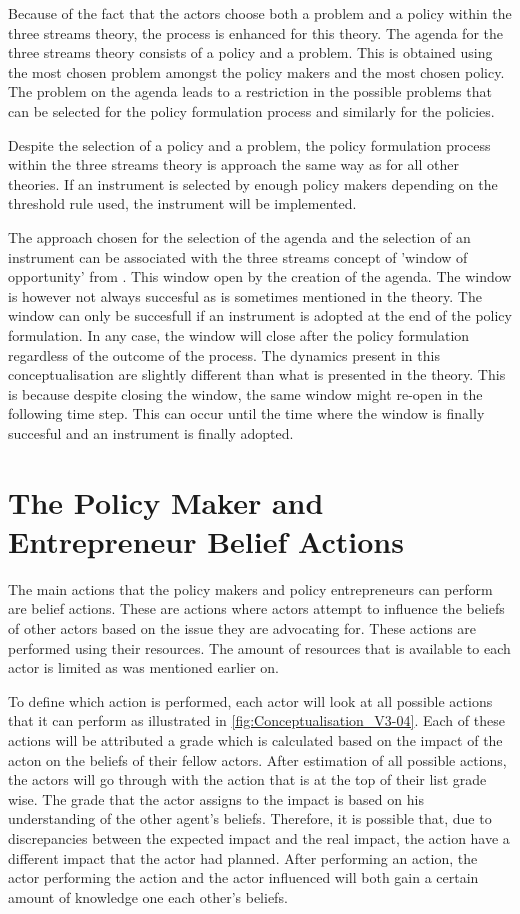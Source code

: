 Because of the fact that the actors choose both a problem and a policy within the three streams theory, the process is enhanced for this theory. The agenda for the three streams theory consists of a policy and a problem. This is obtained using the most chosen problem amongst the policy makers and the most chosen policy. The problem on the agenda leads to a restriction in the possible problems that can be selected for the policy formulation process and similarly for the policies.

Despite the selection of a policy and a problem, the policy formulation process within the three streams theory is approach the same way as for all other theories. If an instrument is selected by enough policy makers depending on the threshold rule used, the instrument will be implemented.

The approach chosen for the selection of the agenda and the selection of an instrument can be associated with the three streams concept of 'window of opportunity' from \cite{kingdon2003agendas}.  This window open by the creation of the agenda. The window is however not always succesful as is sometimes mentioned in the theory. The window can only be succesfull if an instrument is adopted at the end of the policy formulation. In any case, the window will close after the policy formulation regardless of the outcome of the process. The dynamics present in this conceptualisation are slightly different than what is presented in the theory. This is because despite closing the window, the same window might re-open in the following time step. This can occur until the time where the window is finally succesful and an instrument is finally adopted.

%
\section{The Policy Maker and Entrepreneur Belief Actions}
\label{sec:actorBeliefActions}

The main actions that the policy makers and policy entrepreneurs can perform are belief actions. These are actions where actors attempt to influence the beliefs of other actors based on the issue they are advocating for. These actions are performed using their resources. The amount of resources that is available to each actor is limited as was mentioned earlier on.

To define which action is performed, each actor will look at all possible actions that it can perform as illustrated in \autoref{fig:Conceptualisation_V3-04}. Each of these actions will be attributed a grade which is calculated based on the impact of the acton on the beliefs of their fellow actors. After estimation of all possible actions, the actors will go through with the action that is at the top of their list grade wise. The grade that the actor assigns to the impact is based on his understanding of the other agent's beliefs. Therefore, it is possible that, due to discrepancies between the expected impact and the real impact, the action have a different impact that the actor had planned. After performing an action, the actor performing the action and the actor influenced will both gain a certain amount of knowledge one each other's beliefs.

